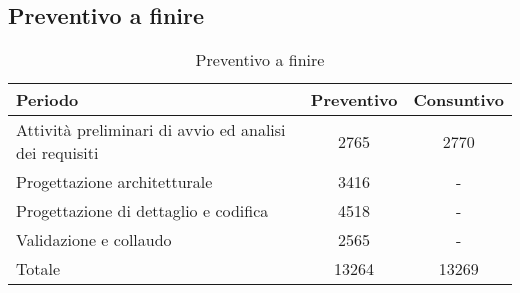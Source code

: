\subsection{Preventivo a finire}
\begin{table}[h!] %
            \centering
            \renewcommand{\arraystretch}{2} %
            \begin{tabular}{|l|c|c|} %
                \rowcolor{orange!50} %
        		\hline
        		\textbf{Periodo} & \textbf{Preventivo} & \textbf{Consuntivo}\\
                \hline
                Attività preliminari di avvio ed analisi dei requisiti & 2765 & 2770\\
                \hline
                Progettazione architetturale & 3416 & -\\
                \hline
                Progettazione di dettaglio e codifica & 4518 & -\\
                \hline
                Validazione e collaudo & 2565 & -\\
                \hline
                Totale & 13264 & 13269\\
                \hline
        \end{tabular}
        \caption{Preventivo a finire} %
        \label{tab:my_label}
\end{table}
